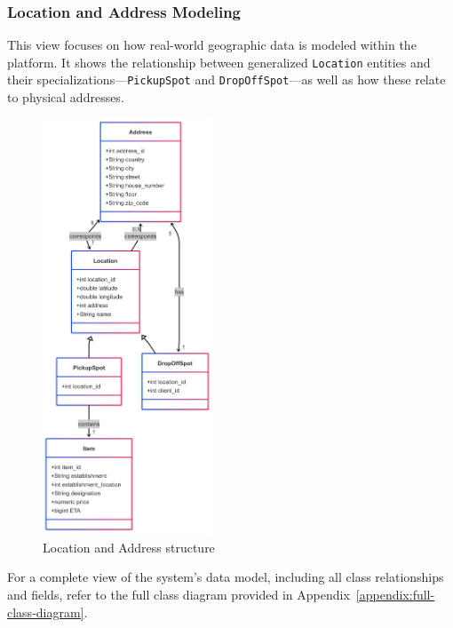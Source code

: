 \newpage

\subsubsection{Location and Address Modeling}

This view focuses on how real-world geographic data is modeled within the platform. It shows the relationship between generalized \texttt{Location} entities and their specializations—\texttt{PickupSpot} and \texttt{DropOffSpot}—as well as how these relate to physical addresses.

\begin{figure}[H]
    \centering
    \includegraphics[width=0.45\textwidth]{images/classDiagrams/location_address_model.png}
    \caption{Location and Address structure}
\end{figure}

\bigskip

\noindent For a complete view of the system’s data model, including all class relationships and fields, refer to the full class diagram provided in Appendix~\ref{appendix:full-class-diagram}.
